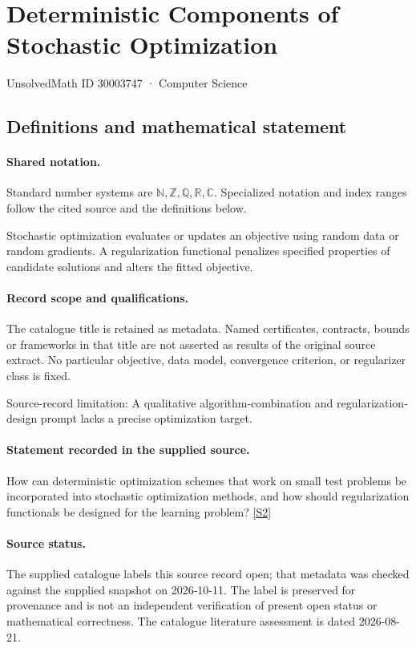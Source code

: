 \documentclass[11pt]{article}
\newcommand{\sref}[2]{\hyperlink{source:#1:#2}{[S#2]}}
\begin{document}
\setcounter{section}{30003746}
\section{Deterministic Components of Stochastic Optimization}\label{30003747}
{\small\sffamily UnsolvedMath ID 30003747 · Computer Science}
\subsection{Definitions and mathematical statement}

\paragraph{Shared notation.}Standard number systems are $\mathbb N,\mathbb Z,\mathbb Q,\mathbb R,\mathbb C$. Specialized notation and index ranges follow the cited source and the definitions below.


Stochastic optimization evaluates or updates an objective using random data or random gradients. A regularization functional penalizes specified properties of candidate solutions and alters the fitted objective.
\paragraph{Record scope and qualifications.}
The catalogue title is retained as metadata. Named certificates, contracts, bounds or frameworks in that title are not asserted as results of the original source extract.
No particular objective, data model, convergence criterion, or regularizer class is fixed.

Source-record limitation: A qualitative algorithm-combination and regularization-design prompt lacks a precise optimization target.
\paragraph{Statement recorded in the supplied source.}
How can deterministic optimization schemes that work on small test problems be incorporated into stochastic optimization methods, and how should regularization functionals be designed for the learning problem? \sref{30003747}{2}
\paragraph{Source status.}
The supplied catalogue labels this source record open; that metadata was checked against the supplied snapshot on 2026-10-11. The label is preserved for provenance and is not an independent verification of present open status or mathematical correctness. The catalogue literature assessment is dated 2026-08-21.
\end{document}
